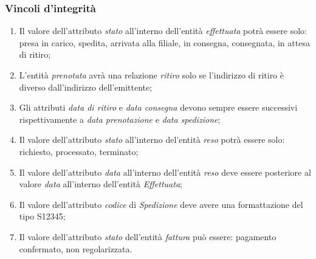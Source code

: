 \documentclass[a4paper,12pt]{article}
\begin{document}
\subsubsection{Vincoli d'integrità}
\begin{enumerate}
  \item Il valore dell'attributo \textit{stato} all'interno dell'entità \textit{effettuata} potrà essere solo: presa in carico, spedita, arrivata alla filiale, in consegna, consegnata, in attesa di ritiro;
  \item L'entità \textit{prenotata} avrà una relazione \textit{ritiro} solo se l'indirizzo di ritiro è diverso dall'indirizzo dell'emittente;
  \item Gli attributi \textit{data di ritiro} e \textit{data consegna} devono sempre essere successivi rispettivamente a \textit{data prenotazione} e \textit{data spedizione};
	\item Il valore dell'attributo \textit{stato} all'interno del'entità \textit{reso} potrà essere solo: richiesto, processato, terminato;
	\item Il valore dell'attributo \textit{data} all'interno dell'entità \textit{reso} deve essere posteriore al valore \textit{data} all'interno dell'entità \textit{Effettuata};
	\item Il valore dell'attributo \textit{codice} di \textit{Spedizione} deve avere una formattazione del tipo S12345;
	\item Il valore dell'attributo \textit{stato} dell'entità \textit{fattura} può essere: pagamento confermato, non regolarizzata. 
\end{enumerate}
\end{document}
